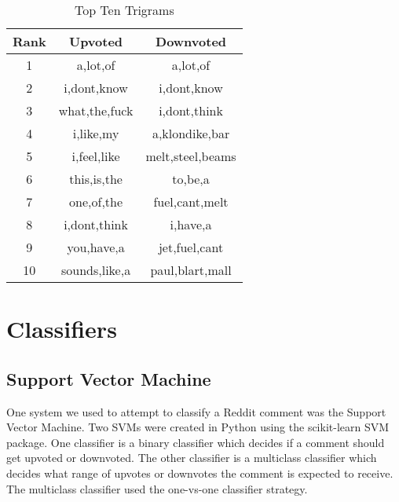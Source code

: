\documentclass{article}
\begin{document}
\begin{table}[h]
\centering
\caption{Top Ten Trigrams}
\begin{tabular}{||c c c||}
\hline
Rank & Upvoted & Downvoted\\
\hline\hline
1 & a,lot,of & a,lot,of\\
2 & i,dont,know & i,dont,know\\
3 & what,the,fuck & i,dont,think\\
4 & i,like,my & a,klondike,bar\\
5 & i,feel,like & melt,steel,beams\\
6 & this,is,the & to,be,a\\
7 & one,of,the & fuel,cant,melt\\
8 & i,dont,think & i,have,a\\
9 & you,have,a & jet,fuel,cant\\
10 & sounds,like,a & paul,blart,mall\\
\hline
\end{tabular}
\end{table}


\section{Classifiers}

\subsection{Support Vector Machine}
One system we used to attempt to classify a Reddit comment was the Support Vector Machine. Two SVMs were created in Python using the scikit-learn SVM package. One classifier is a binary classifier which decides if a comment should get upvoted or downvoted. The other classifier is a multiclass classifier which decides what range of upvotes or downvotes the comment is expected to receive. The multiclass classifier used the one-vs-one classifier strategy.
\end{document}
